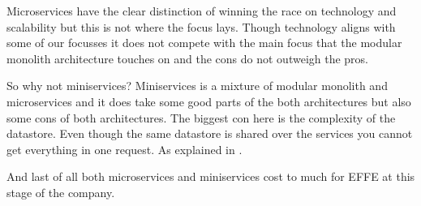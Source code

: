 Microservices have the clear distinction of winning the race on technology and scalability but this is not where the focus lays. Though technology aligns with some of our focusses it does not compete with the main focus that the modular monolith architecture touches on and the cons do not outweigh the pros.

So why not miniservices? Miniservices is a mixture of modular monolith and microservices and it does take some good parts of the both architectures but also some cons of both architectures. The biggest con here is the complexity of the datastore. Even though the same datastore is shared over the services you cannot get everything in one request. As explained in .

And last of all both microservices and miniservices cost to much for EFFE at this stage of the company.
